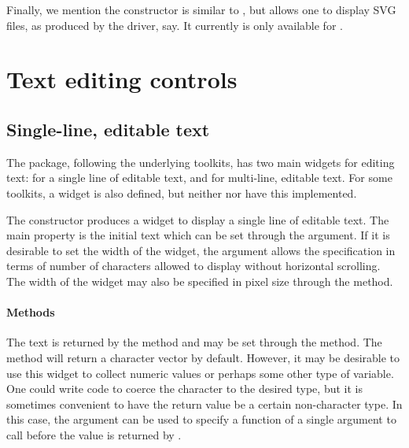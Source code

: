 Finally, we mention the  constructor is similar to , but allows one to
display SVG files, as produced by the  driver, say. It
currently is only available for .

\section{Text editing controls}
\label{sec:gWidgets-text-edit-contr}



\subsection{Single-line, editable text}
\label{sec:gWidgets-single-line-editable}

The  package, following the underlying toolkits, has two
main widgets for editing text:  for a single line
of editable text, and  for multi-line, editable
text.  For some toolkits, a  widget is also
defined, but neither  nor  have this
implemented.


The  constructor produces a widget to display a
single line of editable text. The main property is the initial text
which can be set through the  argument.  If it
is desirable to set the width of the widget, the
 argument allows the specification in terms of
number of characters allowed to display without horizontal
scrolling. The width of the widget may also be specified in pixel size
through the  method.


\paragraph{Methods}
The text is returned by the  method and may be
set through the  method.  The
 method will return a character vector by
default. However, it may be desirable to use this widget to collect
numeric values or perhaps some other type of variable. One could write
code to coerce the character to the desired type, but it is sometimes
convenient to have the return value be a certain non-character
type. In this case, the  argument can be
used to specify a function of a single argument to call before the
value is returned by .

